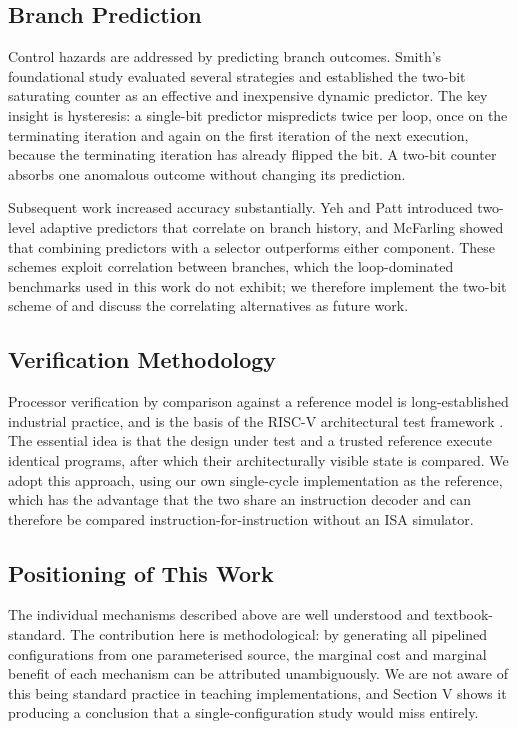 \documentclass[conference]{IEEEtran}
\begin{document}
\subsection{Branch Prediction}

Control hazards are addressed by predicting branch outcomes. Smith's
foundational study \cite{smith1981} evaluated several strategies and
established the two-bit saturating counter as an effective and inexpensive
dynamic predictor. The key insight is hysteresis: a single-bit predictor
mispredicts twice per loop, once on the terminating iteration and again on
the first iteration of the next execution, because the terminating
iteration has already flipped the bit. A two-bit counter absorbs one
anomalous outcome without changing its prediction.

Subsequent work increased accuracy substantially. Yeh and Patt
\cite{yehpatt1991} introduced two-level adaptive predictors that correlate
on branch history, and McFarling \cite{mcfarling1993} showed that combining
predictors with a selector outperforms either component. These schemes
exploit correlation between branches, which the loop-dominated benchmarks
used in this work do not exhibit; we therefore implement the two-bit
scheme of \cite{smith1981} and discuss the correlating alternatives as
future work.

\subsection{Verification Methodology}

Processor verification by comparison against a reference model is
long-established industrial practice, and is the basis of the RISC-V
architectural test framework \cite{riscvarchtest}. The essential idea is
that the design under test and a trusted reference execute identical
programs, after which their architecturally visible state is compared. We
adopt this approach, using our own single-cycle implementation as the
reference, which has the advantage that the two share an instruction
decoder and can therefore be compared instruction-for-instruction without
an ISA simulator.

\subsection{Positioning of This Work}

The individual mechanisms described above are well understood and
textbook-standard. The contribution here is methodological: by generating
all pipelined configurations from one parameterised source, the marginal
cost and marginal benefit of each mechanism can be attributed
unambiguously. We are not aware of this being standard practice in
teaching implementations, and Section V shows it producing a conclusion
that a single-configuration study would miss entirely.
\end{document}
